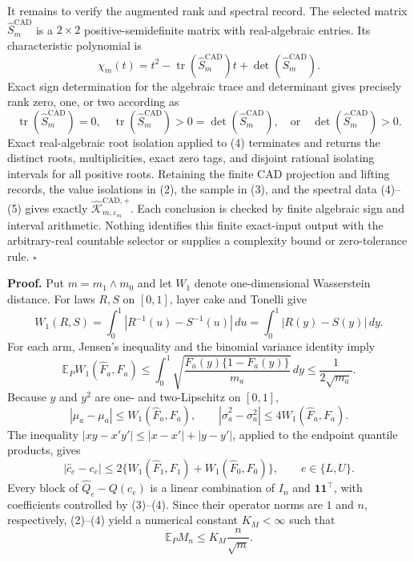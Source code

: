 It remains to verify the augmented rank and spectral record.  The selected matrix \(\widehat S_m^{\mathrm{CAD}}\) is a \(2\times2\) positive-semidefinite matrix with real-algebraic entries.  Its characteristic polynomial is
\[
\chi_m(t)=t^2-\operatorname{tr}(\widehat S_m^{\mathrm{CAD}})t
+\det(\widehat S_m^{\mathrm{CAD}}).
\tag{4}
\]
Exact sign determination for the algebraic trace and determinant gives precisely rank zero, one, or two according as
\[
\operatorname{tr}(\widehat S_m^{\mathrm{CAD}})=0,
\quad
\operatorname{tr}(\widehat S_m^{\mathrm{CAD}})>0=\det(\widehat S_m^{\mathrm{CAD}}),
\quad\text{or}\quad
\det(\widehat S_m^{\mathrm{CAD}})>0.
\tag{5}
\]
Exact real-algebraic root isolation applied to (4) terminates and returns the distinct roots, multiplicities, exact zero tags, and disjoint rational isolating intervals for all positive roots.  Retaining the finite CAD projection and lifting records, the value isolations in (2), the sample in (3), and the spectral data (4)--(5) gives exactly \(\widehat{\mathscr K}_{m,\varepsilon_m}^{\mathrm{CAD},+}\).  Each conclusion is checked by finite algebraic sign and interval arithmetic.  Nothing identifies this finite exact-input output with the arbitrary-real countable selector or supplies a complexity bound or zero-tolerance rule. \(\square\)

\textbf{Proof.}
Put \(m=m_1\wedge m_0\) and let \(W_1\) denote one-dimensional Wasserstein distance.  For laws \(R,S\) on \([0,1]\), layer cake and Tonelli give
\[
W_1(R,S)=\int_0^1|R^{-1}(u)-S^{-1}(u)|\,du
=\int_0^1|R(y)-S(y)|\,dy.
\tag{1}
\]
For each arm, Jensen's inequality and the binomial variance identity imply
\[
\mathbb E_PW_1(\widehat F_a,F_a)
\le\int_0^1\sqrt{\frac{F_a(y)\{1-F_a(y)\}}{m_a}}\,dy
\le\frac1{2\sqrt{m_a}}.
\tag{2}
\]
Because \(y\) and \(y^2\) are one- and two-Lipschitz on \([0,1]\),
\[
|\widehat\mu_a-\mu_a|\le W_1(\widehat F_a,F_a),
\qquad
|\widehat\sigma_a^2-\sigma_a^2|\le4W_1(\widehat F_a,F_a).
\tag{3}
\]
The inequality \(|xy-x'y'|\le|x-x'|+|y-y'|\), applied to the endpoint quantile products, gives
\[
|\widehat c_e-c_e|
\le2\{W_1(\widehat F_1,F_1)+W_1(\widehat F_0,F_0)\},
\qquad e\in\{L,U\}.
\tag{4}
\]
Every block of \(\widehat Q_e-Q(c_e)\) is a linear combination of \(I_n\) and \(\mathbf1\mathbf1^{\top}\), with coefficients controlled by (3)--(4).  Since their operator norms are \(1\) and \(n\), respectively, (2)--(4) yield a numerical constant \(K_M<\infty\) such that
\[
\mathbb E_PM_n\le K_M\frac n{\sqrt m}.
\tag{5}
\]

